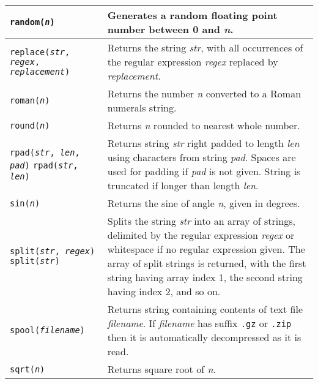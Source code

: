 \begin{longtable}{|p{5cm}|p{7cm}|}
\hline

\texttt{random(\textit{n})} &
Generates a random floating point number between 0 and \textit{n}. \\

\hline

\texttt{replace(\textit{str}, \textit{regex}, \textit{replacement})} &
Returns the string \textit{str}, with all occurrences of the regular
expression \textit{regex} replaced by \textit{replacement}. \\

\hline

\texttt{roman(\textit{n})} &
Returns the number \textit{n} converted to a Roman numerals string. \\

\hline

\texttt{round(\textit{n})} &
Returns \textit{n} rounded to nearest whole number. \\

\hline

\texttt{rpad(\textit{str}, \textit{len}, \textit{pad})}
\texttt{rpad(\textit{str}, \textit{len})} &
Returns string \textit{str} right padded to length \textit{len}
using characters from string \textit{pad}.
Spaces are used for padding if \textit{pad} is not given.
String is truncated if longer than length \textit{len}. \\

\hline

\texttt{sin(\textit{n})} &
Returns the sine of angle \textit{n}, given in degrees. \\

\hline

\texttt{split(\textit{str}, \textit{regex})}
\texttt{split(\textit{str})} &
Splits the string \textit{str} into an array of strings, delimited by the
regular expression \textit{regex} or whitespace if no regular expression given.
The array of split strings is returned,
with the first string having array index 1, the
second string having index 2, and so on. \\

\hline

\texttt{spool(\textit{filename})} &
Returns string containing contents of text file \textit{filename}.
If \textit{filename} has suffix
\texttt{.gz} or \texttt{.zip}
then it is automatically decompressed as it is read.  \\

\hline

\texttt{sqrt(\textit{n})} &
Returns square root of \textit{n}. \\


\end{longtable}
